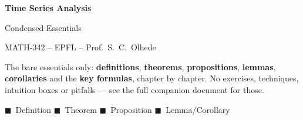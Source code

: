 \documentclass[11pt]{article}
\begin{document}
\begin{titlepage}
\centering
\vspace*{3cm}
{\Huge\bfseries Time Series Analysis\par}
\vspace{0.5cm}
{\LARGE Condensed Essentials\par}
\vspace{0.35cm}
{\large MATH-342 -- EPFL -- Prof.\ S.\ C.\ Olhede\par}
\vspace{1.4cm}
\begin{tcolorbox}[width=0.82\textwidth, colback=blue!4!white,
  colframe=blue!58!black, arc=2mm, boxrule=0.8pt,
  title=\textbf{Scope}, coltitle=white, colbacktitle=blue!58!black,
  fonttitle=\large\bfseries]
The bare essentials only: \textbf{definitions}, \textbf{theorems},
\textbf{propositions}, \textbf{lemmas}, \textbf{corollaries} and the
\textbf{key formulas}, chapter by chapter. No exercises, techniques,
intuition boxes or pitfalls --- see the full companion document for those.
\end{tcolorbox}
\vfill
\begin{tcolorbox}[width=0.82\textwidth, colback=blue!3!white,
  colframe=blue!45!black, arc=1.5mm, boxrule=0.6pt, title=\textbf{Colour legend},
  coltitle=white, colbacktitle=blue!45!black, fonttitle=\bfseries]
\textcolor{blue!58!black}{$\blacksquare$}~Definition \quad
\textcolor{red!62!black}{$\blacksquare$}~Theorem \quad
\textcolor{teal!62!black}{$\blacksquare$}~Proposition \quad
\textcolor{violet!60!black}{$\blacksquare$}~Lemma/Corollary
\end{tcolorbox}
\vspace{1cm}
\end{titlepage}

\tableofcontents
\newpage












\end{document}
